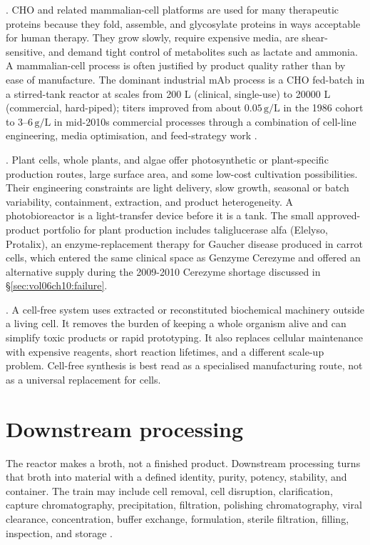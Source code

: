 . CHO and related mammalian-cell platforms are
used for many therapeutic proteins because they fold, assemble, and
glycosylate proteins in ways acceptable for human therapy. They grow
slowly, require expensive media, are shear-sensitive, and demand tight
control of metabolites such as lactate and ammonia. A mammalian-cell
process is often justified by product quality rather than by ease of
manufacture. The dominant industrial mAb process is a CHO fed-batch in
a stirred-tank reactor at scales from 200 L (clinical, single-use) to
20000 L (commercial, hard-piped); titers improved from about
$0.05\,\text{g}/\text{L}$ in the 1986 cohort to $3$--$6\,\text{g}/\text{L}$
in mid-2010s commercial processes through a combination of cell-line
engineering, media optimisation, and feed-strategy work
\cite{paper:v6c10-li-cho-cellline-2010}.

. Plant cells, whole plants, and algae
offer photosynthetic or plant-specific production routes, large surface
area, and some low-cost cultivation possibilities. Their engineering
constraints are light delivery, slow growth, seasonal or batch
variability, containment, extraction, and product heterogeneity. A
photobioreactor is a light-transfer device before it is a tank. The
small approved-product portfolio for plant production includes
taliglucerase alfa (Elelyso, Protalix), an enzyme-replacement therapy
for Gaucher disease produced in carrot cells, which entered the same
clinical space as Genzyme Cerezyme and offered an alternative supply
during the 2009-2010 Cerezyme shortage discussed in
\S\ref{sec:vol06ch10:failure}.

. A cell-free system uses extracted or
reconstituted biochemical machinery outside a living cell. It removes
the burden of keeping a whole organism alive and can simplify toxic
products or rapid prototyping. It also replaces cellular maintenance
with expensive reagents, short reaction lifetimes, and a different
scale-up problem. Cell-free synthesis is best read as a specialised
manufacturing route, not as a universal replacement for cells.

\section{Downstream processing}

The reactor makes a broth, not a finished product. Downstream processing
turns that broth into material with a defined identity, purity, potency,
stability, and container. The train may include cell removal, cell
disruption, clarification, capture chromatography, precipitation,
filtration, polishing chromatography, viral clearance, concentration,
buffer exchange, formulation, sterile filtration, filling, inspection,
and storage \cite[ch.~14]{text:v6c10-shuler-bioprocess-2017,
paper:v6c10-ladisch-bioseparations-2001}.


